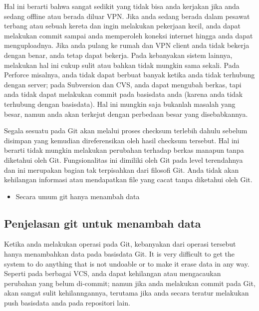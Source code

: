 {\vspace{\baselineskip}
\noindent 
{\fontsize{14pt}{14pt}\selectfont Hal ini berarti bahwa sangat sedikit yang tidak bisa anda kerjakan jika anda sedang offline atau berada diluar VPN. Jika anda sedang berada dalam pesawat terbang atau sebuah kereta dan ingin melakukan pekerjaan kecil, anda dapat melakukan commit sampai anda memperoleh koneksi internet hingga anda dapat menguploadnya. Jika anda pulang ke rumah dan VPN client anda tidak bekerja dengan benar, anda tetap dapat bekerja. Pada kebanyakan sistem lainnya, melakukan hal ini cukup sulit atau bahkan tidak mungkin sama sekali. Pada Perforce misalnya, anda tidak dapat berbuat banyak ketika anda tidak terhubung dengan server; pada Subversion dan CVS, anda dapat mengubah berkas, tapi anda tidak dapat melakukan commit pada basisdata anda (karena anda tidak terhubung dengan basisdata). Hal ini mungkin saja bukanlah masalah yang besar, namun anda akan terkejut dengan perbedaan besar yang disebabkannya. \\} \par

\vspace{\baselineskip}

\noindent 
{\fontsize{14pt}{14pt}\selectfont Segala sesuatu pada Git akan melalui proses checksum terlebih dahulu sebelum disimpan yang kemudian direferensikan oleh hasil checksum tersebut. Hal ini berarti tidak mungkin melakukan perubahan terhadap berkas manapun tanpa diketahui oleh Git. Fungsionalitas ini dimiliki oleh Git pada level terendahnya dan ini merupakan bagian tak terpisahkan dari filosofi Git. Anda tidak akan kehilangan informasi atau mendapatkan file yang cacat tanpa diketahui oleh Git. \\} \par

\vspace{\baselineskip}
\begin{itemize}
	\item Secara umum git hanya menambah data
\end{itemize}

\vspace{\baselineskip}
\noindent 
{\fontsize{14pt}{14pt}\subsection{Penjelasan git untuk menambah data}
	
	\vspace{\baselineskip}
\noindent 
{\fontsize{14pt}{14pt}\selectfont Ketika anda melakukan operasi pada Git, kebanyakan dari operasi tersebut hanya menambahkan data pada basisdata Git. It is very difficult to get the system to do anything that is not undoable or to make it erase data in any way. Seperti pada berbagai VCS, anda dapat kehilangan atau mengacaukan perubahan yang belum di-commit; namun jika anda melakukan commit pada Git, akan sangat sulit kehilanngannya, terutama jika anda secara teratur melakukan push basisdata anda pada repositori lain. \\} \par

}}
